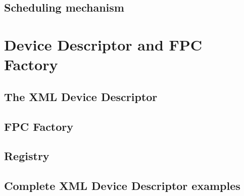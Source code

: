 \subsection{Scheduling mechanism}


\section{Device Descriptor and FPC Factory}

\subsection{The XML Device Descriptor}

\subsection{FPC Factory}

\subsection{Registry}

\subsection{Complete XML Device Descriptor examples}